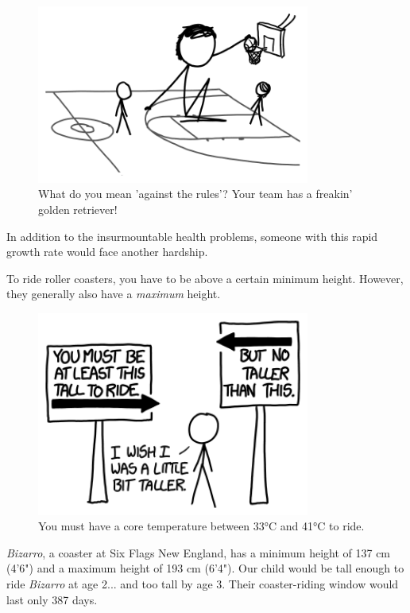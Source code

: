 {\begin{figure}[!htbp]
\centering
\includegraphics[scale=0.5, max width=0.8\textwidth]{imgs/a/77/height_dunk.png}
\caption{What do you mean 'against the rules'? Your team has a freakin' golden retriever!}
\end{figure}

{In addition to the insurmountable health problems, someone with this rapid growth rate would face another hardship.}

{To ride roller coasters, you have to be above a certain minimum height. However, they generally also have a \emph{maximum} height.}

\begin{figure}[!htbp]
\centering
\includegraphics[scale=0.5, max width=0.8\textwidth]{imgs/a/77/height_coaster.png}
\caption{You must have a core temperature between 33°C and 41°C to ride.}
\end{figure}

{ \emph{Bizarro}, a coaster at Six Flags New England, has a minimum height of 137 cm (4'6") and a maximum height of 193 cm (6'4"). Our child would be tall enough to ride \emph{Bizarro} at age 2... and too tall by age 3. Their coaster-riding window would last only 387 days.}

}
